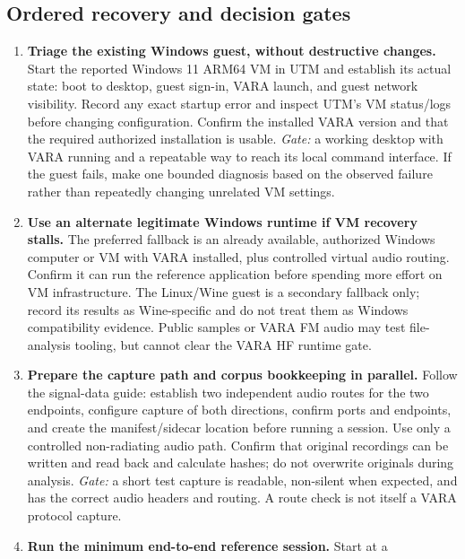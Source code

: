 \documentclass[11pt,a4paper]{article}
\begin{document}
\subsection{Ordered recovery and decision gates}
\begin{enumerate}[leftmargin=*]
  \item \textbf{Triage the existing Windows guest, without destructive
        changes.} Start the reported Windows 11 ARM64 VM in UTM and establish
        its actual state: boot to desktop, guest sign-in, VARA launch, and
        guest network visibility. Record any exact startup error and inspect
        UTM's VM status/logs before changing configuration. Confirm the
        installed VARA version and that the required authorized installation
        is usable. \emph{Gate:} a working desktop with VARA running and a
        repeatable way to reach its local command interface. If the guest
        fails, make one bounded diagnosis based on the observed failure rather
        than repeatedly changing unrelated VM settings.
  \item \textbf{Use an alternate legitimate Windows runtime if VM recovery
        stalls.} The preferred fallback is an already available, authorized
        Windows computer or VM with VARA installed, plus controlled virtual
        audio routing. Confirm it can run the reference application before
        spending more effort on VM infrastructure. The Linux/Wine guest is a
        secondary fallback only; record its results as Wine-specific and do
        not treat them as Windows compatibility evidence. Public samples or
        VARA FM audio may test file-analysis tooling, but cannot clear the
        VARA HF runtime gate.
  \item \textbf{Prepare the capture path and corpus bookkeeping in parallel.}
        Follow the signal-data guide: establish two independent audio routes
        for the two endpoints, configure capture of both directions, confirm
        ports and endpoints, and create the manifest/sidecar location before
        running a session. Use only a controlled non-radiating audio path.
        Confirm that original recordings can be written and read back and
        calculate hashes; do not overwrite originals during analysis.
        \emph{Gate:} a short test capture is readable, non-silent when expected,
        and has the correct audio headers and routing. A route check is not
        itself a VARA protocol capture.
  \item \textbf{Run the minimum end-to-end reference session.} Start at a

\end{enumerate}
\end{document}
